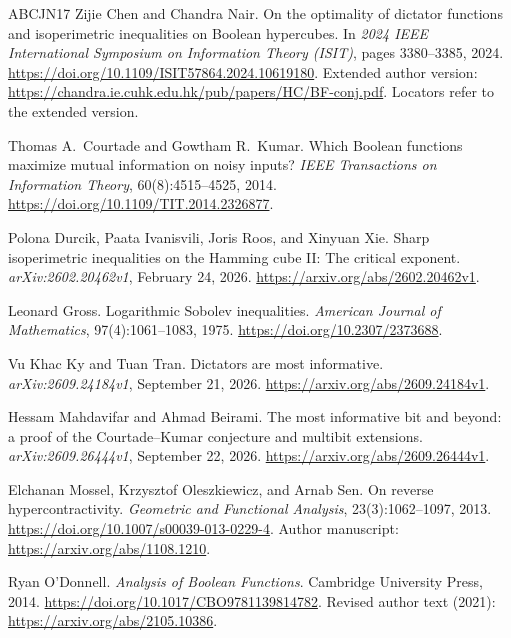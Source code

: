 \begin{thebibliography}{ABCJN17}
Zijie Chen and Chandra Nair.
\newblock On the optimality of dictator functions and isoperimetric inequalities on Boolean hypercubes.
\newblock In \emph{2024 IEEE International Symposium on Information Theory (ISIT)}, pages 3380--3385, 2024.
\newblock \url{https://doi.org/10.1109/ISIT57864.2024.10619180}.
\newblock Extended author version: \url{https://chandra.ie.cuhk.edu.hk/pub/papers/HC/BF-conj.pdf}.
\newblock Locators refer to the extended version.

Thomas A.~Courtade and Gowtham R.~Kumar.
\newblock Which Boolean functions maximize mutual information on noisy inputs?
\newblock \emph{IEEE Transactions on Information Theory}, 60(8):4515--4525,
2014.
\newblock \url{https://doi.org/10.1109/TIT.2014.2326877}.

Polona Durcik, Paata Ivanisvili, Joris Roos, and Xinyuan Xie.
\newblock Sharp isoperimetric inequalities on the Hamming cube II: The critical exponent.
\newblock \emph{arXiv:2602.20462v1}, February 24, 2026.
\newblock \url{https://arxiv.org/abs/2602.20462v1}.

Leonard Gross.
\newblock Logarithmic Sobolev inequalities.
\newblock \emph{American Journal of Mathematics}, 97(4):1061--1083, 1975.
\newblock \url{https://doi.org/10.2307/2373688}.

Vu Khac Ky and Tuan Tran.
\newblock Dictators are most informative.
\newblock \emph{arXiv:2609.24184v1}, September 21, 2026.
\newblock \url{https://arxiv.org/abs/2609.24184v1}.

Hessam Mahdavifar and Ahmad Beirami.
\newblock The most informative bit and beyond: a proof of the Courtade--Kumar conjecture and multibit extensions.
\newblock \emph{arXiv:2609.26444v1}, September 22, 2026.
\newblock \url{https://arxiv.org/abs/2609.26444v1}.

Elchanan Mossel, Krzysztof Oleszkiewicz, and Arnab Sen.
\newblock On reverse hypercontractivity.
\newblock \emph{Geometric and Functional Analysis}, 23(3):1062--1097, 2013.
\newblock \url{https://doi.org/10.1007/s00039-013-0229-4}.
\newblock Author manuscript: \url{https://arxiv.org/abs/1108.1210}.

Ryan O'Donnell.
\newblock \emph{Analysis of Boolean Functions}.
\newblock Cambridge University Press, 2014.
\newblock \url{https://doi.org/10.1017/CBO9781139814782}.
\newblock Revised author text (2021):
\url{https://arxiv.org/abs/2105.10386}.

\end{thebibliography}
